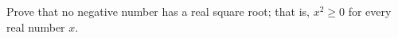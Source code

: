 Prove that no negative number has a real square root; that is, $x^2\ge0$ for every real number $x$.
